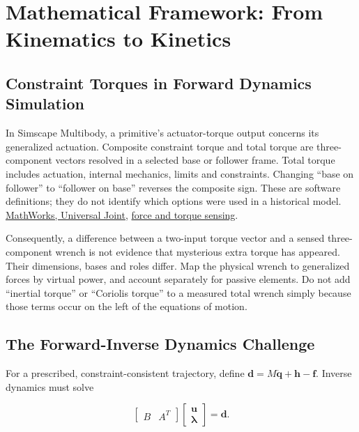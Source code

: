 \documentclass[
  11pt,
]{article}
\begin{document}
\section{Mathematical Framework: From Kinematics to
Kinetics}\label{mathematical-framework-from-kinematics-to-kinetics}

\subsection{Constraint Torques in Forward Dynamics
Simulation}\label{constraint-torques-in-forward-dynamics-simulation}

In Simscape Multibody, a primitive's actuator-torque output concerns its
generalized actuation. Composite constraint torque and total torque are
three-component vectors resolved in a selected base or follower frame.
Total torque includes actuation, internal mechanics, limits and
constraints. Changing ``base on follower'' to ``follower on base''
reverses the composite sign. These are software definitions; they do not
identify which options were used in a historical model.
\href{https://www.mathworks.com/help/sm/ref/universaljoint.html}{MathWorks,
Universal Joint},
\href{https://www.mathworks.com/help/sm/ug/force-and-torque-sensing.html}{force
and torque sensing}.

Consequently, a difference between a two-input torque vector and a
sensed three-component wrench is not evidence that mysterious extra
torque has appeared. Their dimensions, bases and roles differ. Map the
physical wrench to generalized forces by virtual power, and account
separately for passive elements. Do not add ``inertial torque'' or
``Coriolis torque'' to a measured total wrench simply because those
terms occur on the left of the equations of motion.

\subsection{The Forward-Inverse Dynamics
Challenge}\label{the-forward-inverse-dynamics-challenge}

For a prescribed, constraint-consistent trajectory, define
\(\mathbf d=M\ddot{\mathbf q}+\mathbf h-\mathbf f\). Inverse dynamics
must solve

\[
\begin{bmatrix}B&A^T\end{bmatrix}
\begin{bmatrix}\mathbf u\\\boldsymbol\lambda\end{bmatrix}
=\mathbf d.
\]
\end{document}
